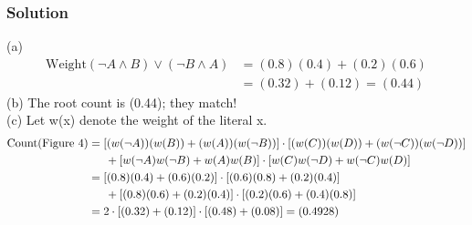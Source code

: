 \documentclass{article}
\begin{document}
\subsubsection*{Solution}
(a) \begin{align*} \text{Weight} (\neg A \land B) \lor (\neg B \land A) &= (0.8)(0.4) + (0.2)(0.6) \\
	&= (0.32) + (0.12) = (0.44) \end{align*}
(b) The root count is (0.44); they match! \\
(c) Let w(x) denote the weight of the literal x.
 \begin{align*} \text{Count(Figure 4)} 
	&= [(w(\neg A)) (w(B)) + (w(A)) (w(\neg B))] \cdot [(w(C)) (w(D)) + (w(\neg C)) (w(\neg D))] \\
		&\indent +  [w(\neg A) w(\neg B) + w(A) w(B)] \cdot [w(C) w(\neg D) + w(\neg C) w(D)] \\
	&= [(0.8)(0.4) + (0.6)(0.2)] \cdot [(0.6)(0.8) + (0.2)(0.4)]\\
		&\indent +[(0.8)(0.6) + (0.2)(0.4)] \cdot [(0.2)(0.6) + (0.4)(0.8)] \\
	&= 2 \cdot [(0.32) + (0.12)] \cdot [(0.48) + (0.08)] = (0.4928) \end{align*}
	
\end{document}
